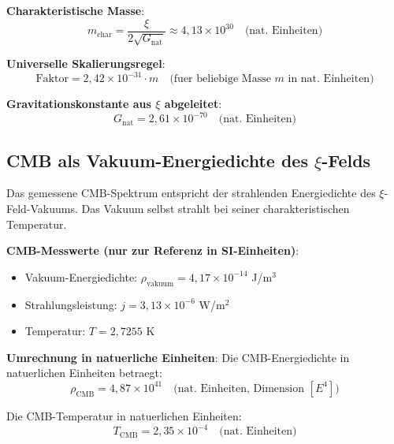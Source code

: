\documentclass[12pt,a4paper]{article}
\begin{document}
	\textbf{Charakteristische Masse}:
	\begin{equation}
		m_{\text{char}} = \frac{\xi}{2\sqrt{G_{\text{nat}}}} \approx 4{,}13 \times 10^{30} \quad \text{(nat. Einheiten)}
	\end{equation}
	
	\textbf{Universelle Skalierungsregel}:
	\begin{equation}
		\text{Faktor} = 2{,}42 \times 10^{-31} \cdot m \quad \text{(fuer beliebige Masse } m \text{ in nat. Einheiten)}
	\end{equation}
	
	\textbf{Gravitationskonstante aus $\xi$ abgeleitet}:
	\begin{equation}
		G_{\text{nat}} = 2{,}61 \times 10^{-70} \quad \text{(nat. Einheiten)}
	\end{equation}
	
	\subsection{CMB als Vakuum-Energiedichte des $\xi$-Felds}
	
	\begin{revolutionary}
		Das gemessene CMB-Spektrum entspricht der strahlenden Energiedichte des $\xi$-Feld-Vakuums. Das Vakuum selbst strahlt bei seiner charakteristischen Temperatur.
	\end{revolutionary}
	
	\begin{sibox}
		\textbf{CMB-Messwerte (nur zur Referenz in SI-Einheiten)}:
		\begin{itemize}
			\item Vakuum-Energiedichte: $\rho_{\text{vakuum}} = 4{,}17 \times 10^{-14}$ J/m$^3$
			\item Strahlungsleistung: $j = 3{,}13 \times 10^{-6}$ W/m$^2$
			\item Temperatur: $T = 2{,}7255$ K
		\end{itemize}
	\end{sibox}
	
	\textbf{Umrechnung in natuerliche Einheiten}:
	Die CMB-Energiedichte in natuerlichen Einheiten betraegt:
	\begin{equation}
		\rho_{\text{CMB}} = 4{,}87 \times 10^{41} \quad \text{(nat. Einheiten, Dimension } [E^4] \text{)}
	\end{equation}
	
	Die CMB-Temperatur in natuerlichen Einheiten:
	\begin{equation}
		T_{\text{CMB}} = 2{,}35 \times 10^{-4} \quad \text{(nat. Einheiten)}
	\end{equation}
	
\end{document}
